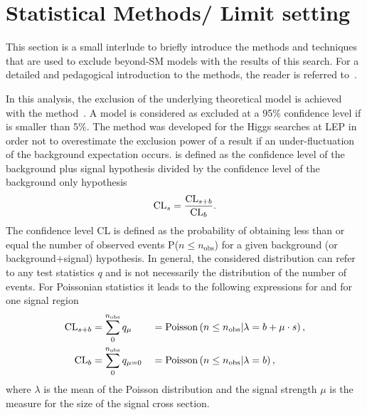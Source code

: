 \section{Statistical Methods/ Limit setting}
This section is a small interlude to briefly introduce the methods and techniques that are used to exclude beyond-SM models with the results of this search.
For a detailed and pedagogical introduction to the methods, the reader is referred to~\cite{bib:Ott_Thesis}.

In this analysis, the exclusion of the underlying theoretical model is achieved with the \CLs method~\cite{bib:CLS_1999,bib:CLS_2000,bib:CLS_2002}.
A model is considered as excluded at a 95\% confidence level if \CLs is smaller than 5\%.
The \CLs method was developed for the Higgs searches at LEP in order not to overestimate the exclusion power of a result if an  under-fluctuation of the background expectation occurs.
\CLs is defined as the confidence level of the background plus signal hypothesis divided by the confidence level of the background only hypothesis
\begin{equation*}
\text{CL}_{s} = \frac{\text{CL}_{s+b}}{\text{CL}_{b}}.
\end{equation*}
The confidence level CL is defined as the probability of obtaining less than or equal the number of observed events P($n\leq n_{\text{obs}}$) for a given background (or background+signal) hypothesis.
In general, the considered distribution can refer to any test statistics $q$ and is not necessarily the distribution of the number of events.
For Poissonian statistics it leads to the following expressions for \CLsb and \CLb for one signal region
\begin{equation}
\label{eq:CLsb_CLb}
\begin{aligned}
\text{CL}_{s+b} &= \sum\limits_{0}^{n_{\text{obs}}} q_{\mu}    &&= \text{Poisson}\left( n\leq n_{\text{obs}} |\lambda = b+\mu\cdot s   \right),\\
\text{CL}_{b}  &= \sum\limits_{0}^{n_{\text{obs}}} q_{\mu = 0} &&= \text{Poisson}\left( n \leq n_{\text{obs}} |\lambda = b   \right),\
\end{aligned}
\end{equation}
where $\lambda$ is the mean of the Poisson distribution and the signal strength $\mu$ is the measure for the size of the signal cross section.


